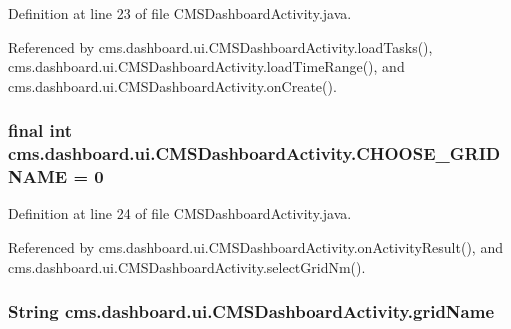 \-Definition at line 23 of file \-C\-M\-S\-Dashboard\-Activity.\-java.



\-Referenced by cms.\-dashboard.\-ui.\-C\-M\-S\-Dashboard\-Activity.\-load\-Tasks(), cms.\-dashboard.\-ui.\-C\-M\-S\-Dashboard\-Activity.\-load\-Time\-Range(), and cms.\-dashboard.\-ui.\-C\-M\-S\-Dashboard\-Activity.\-on\-Create().

\subsubsection[{\-C\-H\-O\-O\-S\-E\-\_\-\-G\-R\-I\-D\-N\-A\-M\-E}]{\setlength{\rightskip}{0pt plus 5cm}final int {\bf cms.\-dashboard.\-ui.\-C\-M\-S\-Dashboard\-Activity.\-C\-H\-O\-O\-S\-E\-\_\-\-G\-R\-I\-D\-N\-A\-M\-E} = 0\hspace{0.3cm}{\ttfamily  [static, private]}}\label{classcms_1_1dashboard_1_1ui_1_1_c_m_s_dashboard_activity_ac617d6878fd233233a60df2fea71e419}


\-Definition at line 24 of file \-C\-M\-S\-Dashboard\-Activity.\-java.



\-Referenced by cms.\-dashboard.\-ui.\-C\-M\-S\-Dashboard\-Activity.\-on\-Activity\-Result(), and cms.\-dashboard.\-ui.\-C\-M\-S\-Dashboard\-Activity.\-select\-Grid\-Nm().

\subsubsection[{grid\-Name}]{\setlength{\rightskip}{0pt plus 5cm}\-String {\bf cms.\-dashboard.\-ui.\-C\-M\-S\-Dashboard\-Activity.\-grid\-Name}\hspace{0.3cm}{\ttfamily  [private]}}\label{classcms_1_1dashboard_1_1ui_1_1_c_m_s_dashboard_activity_a9f67d9f0e8dc493f7209c746d71ef12d}


